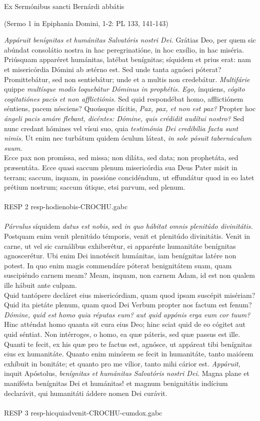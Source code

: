 \documentclass[options]{article}
\begin{document}
	Ex Sermónibus sancti Bernárdi abbátis 
	\begin{flushright}
		(Sermo 1 in Epiphania Domini, 1-2: PL 133, 141-143)
	\end{flushright}
\emph{Appáruit benígnitas et humánitas Salvatóris nostri Dei.} Grátias Deo, per quem sic abúndat consolátio nostra in hac peregrinatióne, in hoc exsílio, in hac miséria.\\
Priúsquam apparéret humánitas, latébat benígnitas; síquidem et prius erat: nam et misericórdia Dómini ab ætérno est. Sed unde tanta agnósci póterat? Promittebátur, sed non sentiebátur; unde et a multis non credebátur. \emph{Multifárie} quippe \emph{multísque modis loquebátur Dóminus in prophétis. Ego,} ínquiens, \emph{cógito cogitatiónes pacis et non afflictiónis.} Sed quid respondébat homo, afflictiónem séntiens, pacem nésciens? Quoúsque dícitis, \emph{Pax, pax, et non est pax?} Propter hoc \emph{ángeli pacis amáre flebant, dicéntes: Dómine, quis crédidit audítui nostro?} Sed nunc credant hómines vel vísui suo, quia \emph{testimónia Dei credibília facta sunt nimis.} Ut enim nec turbátum quidem óculum láteat, \emph{in sole pósuit tabernáculum suum}.\\
Ecce pax non promíssa, sed missa; non diláta, sed data; non prophetáta, sed præsentáta. Ecce quasi saccum plenum misericórdia sua Deus Pater misit in terram; saccum, inquam, in passióne concidéndum, ut effundátur quod in eo latet prétium nostrum; saccum útique, etsi parvum, sed plenum.\\
\\
RESP 2    resp-hodienobis-CROCHU.gabc\\
\\
 \emph{Párvulus} síquidem \emph{datus est nobis,} sed \emph{in quo hábitat omnis plenitúdo divinitátis.} Postquam enim venit plenitúdo témporis, venit et plenitúdo divinitátis. Venit in carne, ut vel sic carnálibus exhiberétur, ei apparénte humanitáte benígnitas agnoscerétur. Ubi enim Dei innotéscit humánitas, iam benígnitas latére non potest. In quo enim magis commendáre póterat benignitátem suam, quam suscipiéndo carnem meam? Meam, inquam, non carnem Adam, id est non qualem ille hábuit ante culpam.\\
Quid tantópere decláret eius misericórdiam, quam quod ipsam suscépit misériam? Quid ita pietáte plenum, quam quod Dei Verbum propter nos factum est fenum? \emph{Dómine, quid est homo quia réputas eum? aut quid appónis erga eum cor tuum?} Hinc atténdat homo quanta sit cura eius Deo; hinc sciat quid de eo cógitet aut quid séntiat. Non intérroges, o homo, ea quæ páteris, sed quæ passus est ille. Quanti te fecit, ex his quæ pro te factus est, agnósce, ut appáreat tibi benígnitas eius ex humanitáte. Quanto enim minórem se fecit in humanitáte, tanto maiórem exhíbuit in bonitáte; et quanto pro me vílior, tanto mihi cárior est. \emph{Appáruit,} inquit Apóstolus, \emph{benígnitas et humánitas Salvatóris nostri Dei.} Magna plane et manifésta benígnitas Dei et humánitas! et magnum benignitátis indícium declarávit, qui humanitáti áddere nomen Dei curávit.\\
\\
RESP 3 resp-hicquiadvenit-CROCHU-cumdox.gabc
\end{document}
